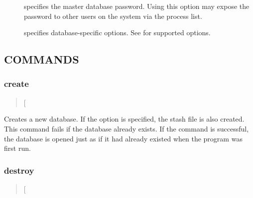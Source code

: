 \documentclass[letterpaper,10pt,english]{sphinxmanual}
\begin{document}
\begin{description}
\item[{ }] \leavevmode
specifies the master database password.  Using this option may
expose the password to other users on the system via the process
list.

\item[{ }] \leavevmode
specifies database-specific options.  See {\hyperref[\detokenize{admin/admin_commands/kadmin_local:kadmin-1}]{}} for
supported options.

\end{description}


\subsection{COMMANDS}
\label{\detokenize{admin/admin_commands/kdb5_util:commands}}\label{\detokenize{admin/admin_commands/kdb5_util:kdb5-util-options-end}}

\subsubsection{create}
\label{\detokenize{admin/admin_commands/kdb5_util:create}}\label{\detokenize{admin/admin_commands/kdb5_util:kdb5-util-create}}\begin{quote}

 {[}\sphinxstylestrong{-s}{]}
\end{quote}

Creates a new database.  If the  option is specified, the stash
file is also created.  This command fails if the database already
exists.  If the command is successful, the database is opened just as
if it had already existed when the program was first run.


\subsubsection{destroy}
\label{\detokenize{admin/admin_commands/kdb5_util:destroy}}\label{\detokenize{admin/admin_commands/kdb5_util:kdb5-util-create-end}}\label{\detokenize{admin/admin_commands/kdb5_util:kdb5-util-destroy}}\begin{quote}

 {[}\sphinxstylestrong{-f}{]}
\end{quote}
\end{document}
